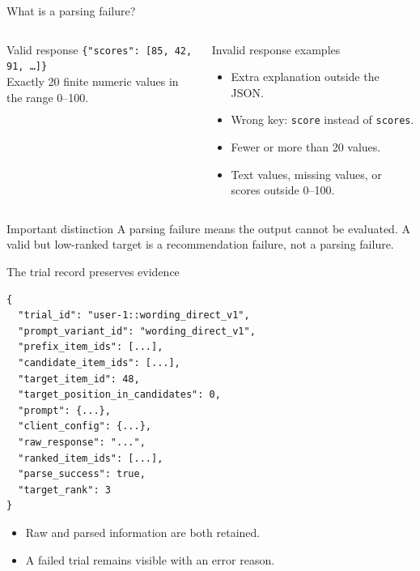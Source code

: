 \documentclass[aspectratio=169,12pt]{beamer}
\newcommand{\code}[1]{\texttt{\footnotesize #1}}
\begin{document}
\begin{frame}{What is a parsing failure?}
\begin{columns}[T]
\begin{exampleblock}{Valid response}
\code{\{"scores": [85, 42, 91, \ldots]\}}\\[0.4em]
Exactly 20 finite numeric values in the range 0--100.
\end{exampleblock}

\begin{alertblock}{Invalid response examples}
\begin{itemize}
  \item Extra explanation outside the JSON.
  \item Wrong key: \code{score} instead of \code{scores}.
  \item Fewer or more than 20 values.
  \item Text values, missing values, or scores outside 0--100.
\end{itemize}
\end{alertblock}
\end{columns}

\vspace{0.5em}
\begin{block}{Important distinction}
A parsing failure means the output cannot be evaluated. A valid but low-ranked
target is a recommendation failure, not a parsing failure.
\end{block}
\end{frame}

\begin{frame}[fragile]{The trial record preserves evidence}
\begin{lstlisting}
{
  "trial_id": "user-1::wording_direct_v1",
  "prompt_variant_id": "wording_direct_v1",
  "prefix_item_ids": [...],
  "candidate_item_ids": [...],
  "target_item_id": 48,
  "target_position_in_candidates": 0,
  "prompt": {...},
  "client_config": {...},
  "raw_response": "...",
  "ranked_item_ids": [...],
  "parse_success": true,
  "target_rank": 3
}
\end{lstlisting}

\begin{itemize}
  \item Raw and parsed information are both retained.
  \item A failed trial remains visible with an error reason.
\end{itemize}
\end{frame}
\end{document}
